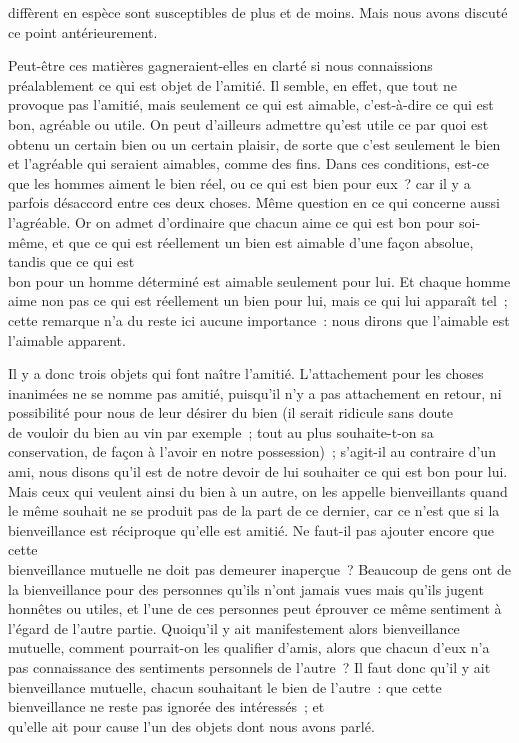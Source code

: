 \documentclass[french,twoside]{book} %
\begin{document}
diffèrent en espèce sont susceptibles de plus et de moins. Mais nous avons discuté ce point antérieurement.\par
Peut-être ces matières gagneraient-elles en clarté si nous connaissions préalablement ce qui est objet de l’amitié. Il semble, en effet, que tout ne provoque pas l’amitié, mais seulement ce qui est aimable, c’est-à-dire ce qui est bon, agréable ou utile. On peut d’ailleurs admettre qu’est utile ce par quoi est \\
obtenu un certain bien ou un certain plaisir, de sorte que c’est seulement le bien et l’agréable qui seraient aimables, comme des fins. Dans ces conditions, est-ce que les hommes aiment le bien réel, ou ce qui est bien pour eux ? car il y a parfois désaccord entre ces deux choses. Même question en ce qui concerne aussi l’agréable. Or on admet d’ordinaire que chacun aime ce qui est bon pour soi-même, et que ce qui est réellement un bien est aimable d’une façon absolue, tandis que ce qui est \\
bon pour un homme déterminé est aimable seulement pour lui. Et chaque homme aime non pas ce qui est réellement un bien pour lui, mais ce qui lui apparaît tel ; cette remarque n’a du reste ici aucune importance : nous dirons que l’aimable est l’aimable apparent.\par
Il y a donc trois objets qui font naître l’amitié. L’attachement pour les choses inanimées ne se nomme pas amitié, puisqu’il n’y a pas attachement en retour, ni possibilité pour nous de leur désirer du bien (il serait ridicule sans doute \\
de vouloir du bien au vin par exemple ; tout au plus souhaite-t-on sa conservation, de façon à l’avoir en notre possession) ; s’agit-il au contraire d’un ami, nous disons qu’il est de notre devoir de lui souhaiter ce qui est bon pour lui. Mais ceux qui veulent ainsi du bien à un autre, on les appelle bienveillants quand le même souhait ne se produit pas de la part de ce dernier, car ce n’est que si la bienveillance est réciproque qu’elle est amitié. Ne faut-il pas ajouter encore que cette \\
bienveillance mutuelle ne doit pas demeurer inaperçue ? Beaucoup de gens ont de la bienveillance pour des personnes  qu’ils n’ont jamais vues mais qu’ils jugent honnêtes ou utiles, et l’une de ces personnes peut éprouver ce même sentiment à l’égard de l’autre partie. Quoiqu’il y ait manifestement alors bienveillance mutuelle, comment pourrait-on les qualifier d’amis, alors que chacun d’eux n’a pas connaissance des sentiments personnels de l’autre ? Il faut donc qu’il y ait bienveillance mutuelle, chacun souhaitant le bien de l’autre : que cette bienveillance ne reste pas ignorée des intéressés ; et \\
qu’elle ait pour cause l’un des objets dont nous avons parlé.
\end{document}
